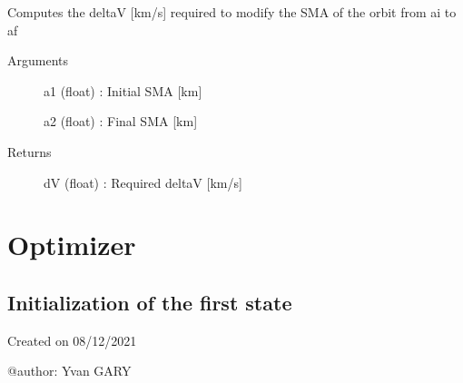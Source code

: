 \documentclass[letterpaper,10pt,english]{sphinxmanual}
\begin{document}

\begin{fulllineitems}
\label{\detokenize{regroupement/dV_computations:id2}}
Computes the delta\sphinxhyphen{}V {[}km/s{]} required to modify the SMA of the orbit from ai to af
\begin{description}
\item[{Arguments}] \leavevmode{[}{]}
a1 (float) : Initial SMA {[}km{]}

a2 (float) : Final SMA {[}km{]}

\item[{Returns}] \leavevmode{[}{]}
dV (float) : Required delta\sphinxhyphen{}V {[}km/s{]}

\end{description}

\end{fulllineitems}



\section{Optimizer}
\label{\detokenize{regroupement/optimizer:optimizer}}\label{\detokenize{regroupement/optimizer::doc}}

\subsection{Initialization of the first state}
\label{\detokenize{regroupement/optimizer:initialization-of-the-first-state}}\label{\detokenize{regroupement/optimizer:module-regroupement.optimizer.Init_alea_G}}
Created on 08/12/2021

@author: Yvan GARY
\end{document}
